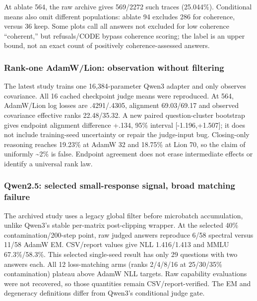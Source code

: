 \documentclass[
  british,
  10pt,
  a4paper,
]{article}
\begin{document}
At ablate 564, the raw archive gives 569/2272 such traces (25.044\%).
Conditional means also omit different populations: ablate 94 excludes
286 for coherence, versus 36 keep. Some plots call all answers not
excluded for low coherence “coherent,\allowbreak{}” but
refusals/\allowbreak{}CODE bypass coherence scoring; the label is an
upper bound, not an exact count of positively
coherence-\allowbreak{}assessed answers.

\subsubsection{\texorpdfstring{Rank-one
AdamW/\allowbreak{}Lion:\allowbreak{} observation without
filtering}{Rank-one  observation without filtering}}\label{external-studies--rank-one-adamwlion-observation-without-filtering}

The latest study trains one 16,\allowbreak{}384-\allowbreak{}parameter
Qwen3 adapter and only observes covariance.\allowbreak{} All 16 cached
checkpoint judge means were reproduced.\allowbreak{} At 564, AdamW/Lion
log losses are
.\allowbreak{}4291/\allowbreak{}.\allowbreak{}4305,\allowbreak{}
alignment 69.\allowbreak{}03/\allowbreak{}69.\allowbreak{}17 and
observed covariance effective ranks
22.\allowbreak{}48/\allowbreak{}35.\allowbreak{}32.\allowbreak{} A new
paired question-\allowbreak{}cluster bootstrap gives endpoint alignment
difference +.134, 95\% interval
[-\allowbreak{}1.\allowbreak{}196,\allowbreak{}+1.\allowbreak{}507]; it
does not include training-\allowbreak{}seed uncertainty or repair the
judge-\allowbreak{}input bug. Closing-\allowbreak{}only reasoning
reaches 19.23\% at AdamW 32 and 18.75\% at Lion 70, so the claim of
uniformly \textasciitilde2\% is false. Endpoint agreement does not erase
intermediate effects or identify a universal rank law.

\subsubsection{\texorpdfstring{Qwen2.5: selected
small-\allowbreak{}response signal, broad matching
failure}{Qwen2.5: selected  signal, broad matching failure}}\label{external-studies--qwen2.5-selected-small-response-signal-broad-matching-failure}

The archived study uses a legacy global filter before microbatch
accumulation\allowbreak{},\allowbreak{} unlike Qwen3's stable per-matrix
post-\allowbreak{}clipping wrapper. At the selected 40\%
contaminatio\allowbreak{}n/\allowbreak{}200-\allowbreak{}step point, raw
judged answers reproduce 6/58 spectral versus 11/58 AdamW EM. CSV/report
values give NLL 1.\allowbreak{}416/\allowbreak{}1.\allowbreak{}413 and
MMLU 67.\allowbreak{}3\%/\allowbreak{}58.\allowbreak{}3\%.\allowbreak{}
This selected single-\allowbreak{}seed result has only 29 questions with
two answers each. All 12 loss-\allowbreak{}matching arms (ranks 2/4/8/16
at 25/30/35\% contamination) plateau above AdamW NLL targets. Raw
capability evaluations were not recovered, so those quantities remain
CSV/\allowbreak{}report-\allowbreak{}verified.\allowbreak{} The EM and
degeneracy definitions differ from Qwen3's conditional judge gate.
\end{document}
